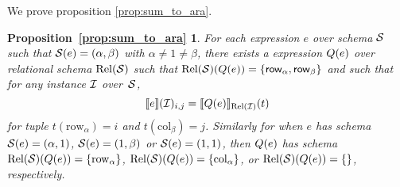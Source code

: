 \newtheorem*{SUMTOARA}{Proposition~\ref{prop:sum_to_ara}}

We prove proposition \ref{prop:sum_to_ara}.

\begin{SUMTOARA}
  For each \langsum expression $e$ over schema $\mathcal{S}$ such that $\mathcal{S}(e)=(\alpha,\beta)$ with $\alpha\neq 1\neq\beta$, there exists a \rak  expression $Q(e)$ over relational schema $\text{Rel}(\mathcal{S})$ such that $\text{Rel}(\mathcal{S})(Q(e))=\{\mathsf{row}_\alpha,\mathsf{row}_\beta\}$ and 
	such that for any instance $\mathcal{I}$ over~$\mathcal{S}$,
	$$
	\llbracket e \rrbracket(\mathcal{I})_{i,j}=\llbracket Q(e) \rrbracket_{\text{Rel}(\mathcal{I})}(t)
	$$
	for tuple $t(\mathrm{row}_\alpha)=i$ and $t(\mathrm{col}_\beta)=j$. Similarly for when $e$ has schema $\mathcal{S}(e)=(\alpha,1)$, $\mathcal{S}(e)=(1,\beta)$ or $\mathcal{S}(e)=(1,1)$, then $Q(e)$ has schema $\text{Rel}(\mathcal{S})(Q(e))=\{\mathrm{row}_\alpha\}$,
	$\text{Rel}(\mathcal{S})(Q(e))=\{\mathrm{col}_\alpha\}$, or
	$\text{Rel}(\mathcal{S})(Q(e))=\{\}$, respectively.
\end{SUMTOARA}

